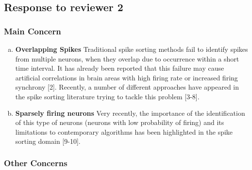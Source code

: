 \subsection{Response to reviewer 2} %
\label{sub:response_to_reviewer_2}



\subsubsection{Main Concern} %
\label{ssub:main_concern}


\begin{enumerate}[a.]
	\item \textbf{Overlapping Spikes} Traditional spike sorting methods fail to identify spikes from multiple neurons, when they overlap due to occurrence within a short time interval. It has already been reported that this failure may cause artificial correlations in brain areas with high firing rate or increased firing synchrony [2].  Recently, a number of different approaches have appeared in the spike sorting literature trying to tackle this problem [3-8].
	
	
	\item \textbf{Sparsely firing neurons} Very recently, the importance of the identification of this type of neurons (neurons with low probability of firing) and its limitations to contemporary algorithms has been highlighted in the spike sorting domain [9-10].
	
	

\end{enumerate}

\subsubsection{Other Concerns} %
\label{ssub:other_concerns}


